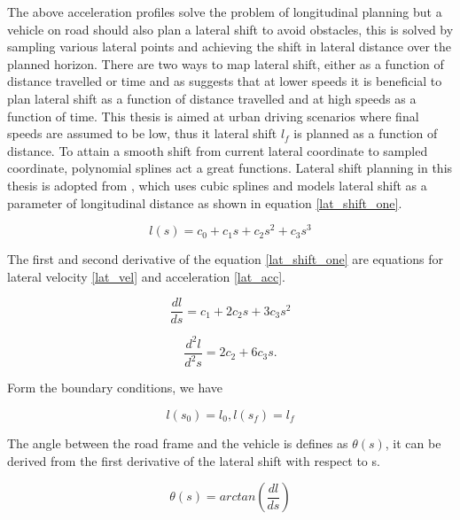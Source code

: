 
The above acceleration profiles solve the problem of longitudinal planning but a vehicle on road should also plan a lateral shift to avoid obstacles, this is solved by sampling various lateral points and achieving the shift in lateral distance over the planned horizon. There are two ways to map lateral shift, either as a function of distance travelled or time and as \cite{werling_frenet} suggests that at lower speeds it is beneficial to plan lateral shift as a function of distance travelled and at high speeds as a function of time. This thesis is aimed at urban driving scenarios where final speeds are assumed to be low, thus it lateral shift $ l_f $ is planned as a function of distance. To attain a smooth shift from current lateral coordinate to sampled coordinate, polynomial splines act a great functions. Lateral shift planning in this thesis is adopted from \cite{real_time_traj_plan_article}, which uses cubic splines and models lateral shift as a parameter of longitudinal distance as shown in equation \ref{lat_shift_one}.

\begin{equation}
l(s) = c_0 + c_1s + c_2s^2 + c_3s^3
\label{lat_shift_one}
\end{equation}

The first and second derivative of the equation \ref{lat_shift_one} are equations for lateral velocity \ref{lat_vel} and acceleration \ref{lat_acc}.

\begin{equation}
    \frac{dl}{ds} = c_1 + 2c_2s + 3c_3s^2
\label{lat_vel}
\end{equation}


\begin{equation}
    \frac{d^2l}{d^2s} = 2c_2 + 6c_3s.
\label{lat_acc}    
\end{equation}

Form the boundary conditions, we have

\begin{equation}
l(s_0) = l_0 , l(s_f ) = l_f
\label{lat_boudary}
\end{equation}

The angle between the road frame and the vehicle is defines as $\theta(s)$, it can be derived from the first derivative of the lateral shift with respect to s. 

\begin{equation}
\theta(s) = arctan(\frac{dl}{ds})
\label{lat_veh_theta}
\end{equation}

